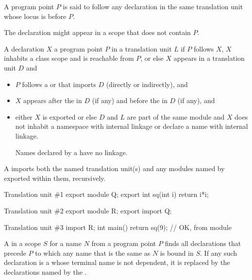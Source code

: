 \pnum
A program point $P$ is said to follow
any declaration in the same translation unit
whose locus is before $P$.
\begin{note}
The declaration might appear in a scope that does not contain $P$.
\end{note}
%
A declaration $X$ 
a program point $P$ in a translation unit $L$
if $P$ follows $X$, $X$ inhabits a class scope and is reachable from $P$, or
else $X$ appears in a translation unit $D$ and
\begin{itemize}
\item
$P$ follows
a  or 
that imports $D$ (directly or indirectly), and
\item
$X$ appears after the  in $D$ (if any) and
before the  in $D$ (if any), and
\item
either $X$ is exported or else $D$ and $L$ are part of the same module and
$X$ does not inhabit a namespace with internal linkage or
declare a name with internal linkage.
\begin{note}
Names declared by a  have no linkage.
\end{note}
\end{itemize}
\begin{note}
A  imports both
the named translation unit(s) and
any modules named by exported
 within them,
recursively.
\begin{example}
\begin{codeblocktu}{Translation unit \#1}
export module Q;
export int sq(int i) { return i*i; }
\end{codeblocktu}

\begin{codeblocktu}{Translation unit \#2}
export module R;
export import Q;
\end{codeblocktu}

\begin{codeblocktu}{Translation unit \#3}
import R;
int main() { return sq(9); }    // OK,  from module 
\end{codeblocktu}
\end{example}
\end{note}

\pnum
{}%
A  in a scope $S$
for a name $N$ from a program point $P$
finds all declarations that precede $P$
to which any name that is the same as $N$ is bound in $S$.
If any such declaration is a 
whose terminal name
is not dependent,
it is replaced by the declarations named by
the .

